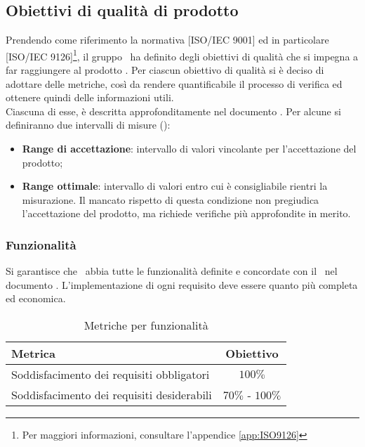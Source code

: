 \documentclass[../PianoDiQualifica.tex]{subfiles}
\begin{document}
		\subsection{Obiettivi di qualità di prodotto}\label{sez:obiettiviQualitaProdotto}
			Prendendo come riferimento la normativa [ISO/IEC 9001] ed in particolare
			[ISO/IEC 9126]\footnote{Per maggiori informazioni, consultare l'appendice
			\ref{app:ISO9126}}, il gruppo \kaleidoscode\ ha definito degli obiettivi di
			qualità che si impegna a far raggiungere al prodotto \progetto.
			Per ciascun obiettivo di qualità si è deciso di adottare delle metriche, così da rendere
			quantificabile il processo di verifica ed ottenere quindi delle informazioni utili.\\
			Ciascuna di esse, è descritta approfonditamente nel documento \normediprogetto.
			Per alcune si definiranno due intervalli di misure ():
			\begin{itemize}
				\item \textbf{Range di accettazione}: intervallo di valori
				vincolante per l'accettazione del prodotto;
				\item \textbf{Range ottimale}: intervallo di valori entro cui è
				consigliabile rientri la misurazione. Il mancato rispetto di
				questa condizione non pregiudica l'accettazione del prodotto, ma
				richiede verifiche più approfondite in merito.
			\end{itemize}
			\subsubsection{Funzionalità}
				Si garantisce che \progetto\ abbia tutte le funzionalità
				definite e concordate con il \proponente\ nel documento
				\analisideirequisitiv. L'implementazione di
				ogni requisito deve essere quanto più completa ed economica.\\
				\begin{table}[H]
				\center
					\begin{tabular}{|l|c|}
						\hline
						\rowcolor{blue!30}\textbf{Metrica} & \textbf{Obiettivo} \\ \hline
						Soddisfacimento dei requisiti obbligatori & $100\%$\\ \hline
						Soddisfacimento dei requisiti desiderabili & $70\%$ - $100\%$\\ \hline
					\end{tabular}
					\caption{Metriche per funzionalità}
				\end{table}
\end{document}
